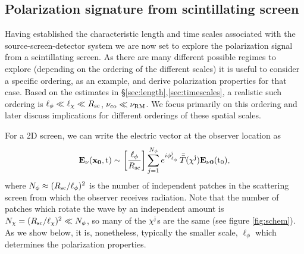 \documentclass[fleqn,usenatbib]{mnras}
\begin{document}
	\subsection{Polarization signature from scintillating screen}
	\label{sec:Polscreen}
	Having established the characteristic length and time scales associated with the source-screen-detector system we are now set to explore the polarization signal from a scintillating screen. As there are many different possible regimes to explore (depending on the ordering of the different scales) it is useful to consider a specific ordering, as an example, and derive polarization properties for that case. Based on the estimates in \S \ref{sec:length},\ref{sec:timescales}, a realistic such ordering is $\ell_{\phi}\ll \ell_{\chi}\ll R_{\rm sc}$, $\nu_{\rm co}\ll\nu_{\rm RM}$. We focus primarily on this ordering and later discuss implications for different orderings of these spatial scales. 
	
	For a 2D screen, we can write the electric vector at the observer location as
	\begin{equation}
		{\bf E_\nu(x_0, \rm t)} \sim \left[\frac{\ell_\phi}{R_{\rm sc}}\right] \sum_{j=1}^{N_{\phi}} e^{i \phi_{\ell_\phi}^{\rm j}}\, {\bar{\bar T}}(\chi^{\rm j})
		{\bf E_{\nu 0}(\rm t_0}),
		\label{E-pol}
	\end{equation}
	where $N_{\phi}\approx (R_{\rm sc}/\ell_{\phi})^2$ is the number of independent patches in the scattering screen from which the observer receives radiation. Note that the number of patches which rotate the wave by an independent amount is $N_{\chi}=(R_{\rm sc}/\ell_{\chi})^2\ll N_{\phi}$, so many of the $\chi^{\rm j}$s are the same (see figure \ref{fig:schem}).
	As we show below, it is, nonetheless, typically the smaller scale, $\ell_{\phi}$ which determines the polarization properties.
	
\end{document}
